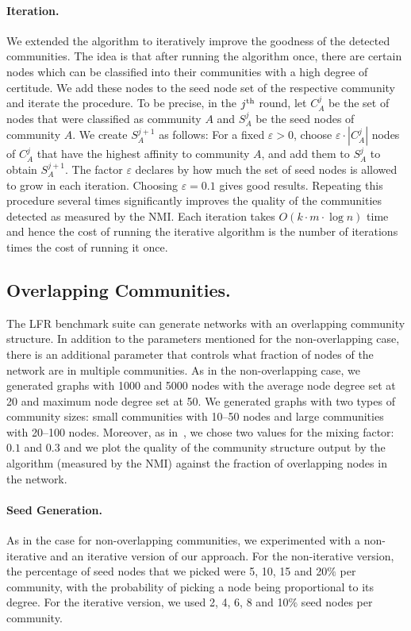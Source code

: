 \paragraph{Iteration.}
We extended the algorithm to iteratively improve the goodness of the detected communities.
The idea is that after running the algorithm once, there are certain nodes which can be classified 
into their communities with a high degree of certitude. We add these nodes to the seed node 
set of the respective community and iterate the procedure. To be precise, in the $j^{\textrm{th}}$ round, 
let $C^j_A$ be the set of nodes that were classified as community $A$ and $S^j_A$ 
be the seed nodes of community $A$. We create $S^{j+1}_A$ as follows: For a fixed $\varepsilon > 0$, 
choose $\varepsilon \cdot |C^j_A|$ nodes of $C^j_A$ that have the highest affinity to community $A$, 
and add them to $S^j_A$ to obtain $S^{j + 1}_A$. 
The factor $\varepsilon$ declares by how much the set of seed nodes is allowed to grow in each iteration. 
Choosing $\varepsilon = 0.1$ gives good results. Repeating this procedure several times significantly 
improves the quality of the communities detected as measured by the NMI. Each iteration takes 
$O(k \cdot m \cdot \log n)$ time and hence the cost of running the iterative algorithm is 
the number of iterations times the cost of running it once. 

\subsection{Overlapping Communities.}
The LFR benchmark suite can generate networks with an overlapping community structure. 
In addition to the parameters mentioned for the non-overlapping case, there is an additional 
parameter that controls what fraction of nodes of the network are in multiple communities. 
As in the non-overlapping case, we generated graphs with 1000 and 5000 nodes with the average
node degree set at 20 and maximum node degree set at 50. We generated graphs with two types 
of community sizes: small communities with 10--50 nodes and large communities with 20--100 nodes.
Moreover, as in~\cite{LF09}, we chose two values for the mixing factor: $0.1$ and $0.3$ 
and we plot the quality of the community structure output by the algorithm 
(measured by the NMI) against the fraction of overlapping nodes in the network.


\paragraph{Seed Generation.}
As in the case for non-overlapping communities, we experimented with a non-iterative 
and an iterative version of our approach. For the non-iterative version, the percentage 
of seed nodes that we picked were 5, 10, 15 and 20$\%$ per community, with the probability
of picking a node being proportional to its degree. For the iterative version, we used 
2, 4, 6, 8 and 10$\%$ seed nodes per community. 

